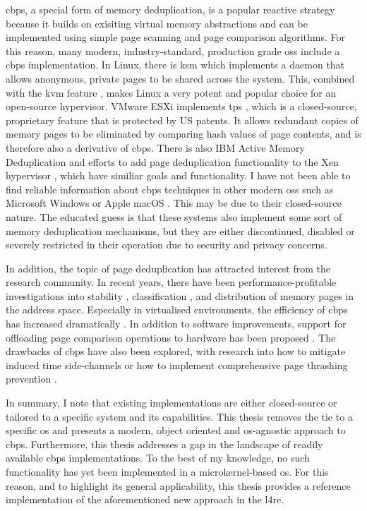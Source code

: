 \Acf{cbps}, a special form of memory deduplication, is a popular reactive strategy because it builds on exisiting virtual memory abstractions and can be implemented using simple page scanning and page comparison algorithms.
For this reason, many modern, industry-standard, production grade \acp{os} include a \ac{cbps} implementation.
In Linux, there is \ac{ksm} \cite{ksm} which implements a daemon that allows anonymous, private pages to be shared across the system.
This, combined with the \ac{kvm} feature \cite{kvm}, makes Linux a very potent and popular choice for an open-source hypervisor.
VMware ESXi implements \ac{tps} \cite{vmware-tps2021}, which is a closed-source, proprietary feature that is protected by US patents.
It allows redundant copies of memory pages to be eliminated by comparing hash values of page contents, and is therefore also a derivative of \ac{cbps}.
There is also IBM Active Memory Deduplication \cite{ibm-amd2012} and efforts to add page deduplication functionality to the Xen hypervisor \cite{vmdedup2014}, which have similiar goals and functionality.
I have not been able to find reliable information about \ac{cbps} techniques in other modern \acp{os} such as Microsoft Windows \cite{microsoft-windows} or Apple macOS \cite{apple-macos}.
This may be due to their closed-source nature.
The educated guess is that these systems also implement some sort of memory deduplication mechanisms, but they are either discontinued, disabled or severely restricted in their operation due to security and privacy concerns.

In addition, the topic of page deduplication has attracted interest from the research community.
In recent years, there have been performance-profitable investigations into stability \cite{spm-page-stability2016, spm-page-stability2017}, classification \cite{spm-classification2014}, and distribution \cite{spm-distribution2019} of memory pages in the address space.
Especially in virtualised environments, the efficiency of \ac{cbps} has increased dramatically \cite{spm-virtualisation2012}.
In addition to software improvements, support for offloading page comparison operations to hardware has been proposed \cite{spm-hardware2019}.
The drawbacks of \ac{cbps} have also been explored, with research into how to mitigate induced time side-channels \cite{spm-side-channels2018} or how to implement comprehensive page thrashing prevention \cite{spm-thrashing2016}.

In summary, I note that existing implementations are either closed-source or tailored to a specific system and its capabilities.
This thesis removes the tie to a specific \ac{os} and presents a modern, object oriented and \ac{os}-agnostic approach to \ac{cbps}.
Furthermore, this thesis addresses a gap in the landscape of readily available \ac{cbps} implementations.
To the best of my knowledge, no such functionality has yet been implemented in a microkernel-based \ac{os}.
For this reason, and to highlight its general applicability, this thesis provides a reference implementation of the aforementioned new approach in the \acl{l4re}.

